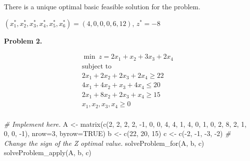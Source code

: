 \documentclass[
]{article}
\newenvironment{Shaded}{\begin{snugshade}}{\end{snugshade}}
\newcommand{\AttributeTok}[1]{\textcolor[rgb]{0.77,0.63,0.00}{#1}}
\newcommand{\CommentTok}[1]{\textcolor[rgb]{0.56,0.35,0.01}{\textit{#1}}}
\newcommand{\ConstantTok}[1]{\textcolor[rgb]{0.00,0.00,0.00}{#1}}
\newcommand{\DecValTok}[1]{\textcolor[rgb]{0.00,0.00,0.81}{#1}}
\newcommand{\FunctionTok}[1]{\textcolor[rgb]{0.00,0.00,0.00}{#1}}
\newcommand{\NormalTok}[1]{#1}
\newcommand{\OtherTok}[1]{\textcolor[rgb]{0.56,0.35,0.01}{#1}}
\newcommand{\SpecialCharTok}[1]{\textcolor[rgb]{0.00,0.00,0.00}{#1}}
\begin{document}
There is a unique optimal basic feasible solution for the problem.

\((x^*_1, x^*_2, x^*_3, x^*_4, x^*_5, x^*_6)=(4, 0, 0, 0, 6, 12)\),
\(z^*=-8\)

\textbf{Problem 2.}

\vspace{-0.5cm}

\begin{eqnarray*}
\min\ z=2x_{1}+x_{2}+3x_3+2x_4\\
\mbox{subject to}\hspace{3cm}\\
2x_{1}+2x_{2}+2x_3+2x_4\geq 22\\
4x_{1}+4x_{2}+x_3+4x_4\leq 20\\
2x_{1}+8x_{2}+2x_3+x_4\geq 15 \\
x_{1},x_{2},x_{3},x_4\geq 0\\
\end{eqnarray*}

\vspace{-0.5cm}

\begin{Shaded}
\begin{Highlighting}[]
\CommentTok{\# Implement here.}
\NormalTok{A }\OtherTok{\textless{}{-}} \FunctionTok{matrix}\NormalTok{(}\FunctionTok{c}\NormalTok{(}\DecValTok{2}\NormalTok{, }\DecValTok{2}\NormalTok{, }\DecValTok{2}\NormalTok{, }\DecValTok{2}\NormalTok{, }\SpecialCharTok{{-}}\DecValTok{1}\NormalTok{, }\DecValTok{0}\NormalTok{, }\DecValTok{0}\NormalTok{, }\DecValTok{4}\NormalTok{, }\DecValTok{4}\NormalTok{, }\DecValTok{1}\NormalTok{, }\DecValTok{4}\NormalTok{, }\DecValTok{0}\NormalTok{, }\DecValTok{1}\NormalTok{, }\DecValTok{0}\NormalTok{, }\DecValTok{2}\NormalTok{, }\DecValTok{8}\NormalTok{, }\DecValTok{2}\NormalTok{, }\DecValTok{1}\NormalTok{, }\DecValTok{0}\NormalTok{, }\DecValTok{0}\NormalTok{, }\SpecialCharTok{{-}}\DecValTok{1}\NormalTok{), }\AttributeTok{nrow=}\DecValTok{3}\NormalTok{, }\AttributeTok{byrow=}\ConstantTok{TRUE}\NormalTok{)}
\NormalTok{b }\OtherTok{\textless{}{-}} \FunctionTok{c}\NormalTok{(}\DecValTok{22}\NormalTok{, }\DecValTok{20}\NormalTok{, }\DecValTok{15}\NormalTok{)}
\NormalTok{c }\OtherTok{\textless{}{-}} \FunctionTok{c}\NormalTok{(}\SpecialCharTok{{-}}\DecValTok{2}\NormalTok{, }\SpecialCharTok{{-}}\DecValTok{1}\NormalTok{, }\SpecialCharTok{{-}}\DecValTok{3}\NormalTok{, }\SpecialCharTok{{-}}\DecValTok{2}\NormalTok{)}
\CommentTok{\# Change the sign of the Z optimal value.}
\FunctionTok{solveProblem\_for}\NormalTok{(A, b, c)}
\FunctionTok{solveProblem\_apply}\NormalTok{(A, b, c)}
\end{Highlighting}
\end{Shaded}
\end{document}
